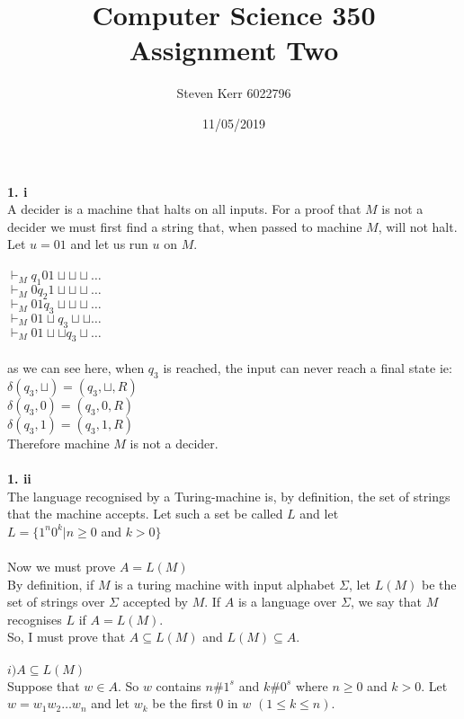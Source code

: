 \documentclass[a4paper,12pt]{article}
\title{Computer Science 350 \\
\large Assignment Two}
\author{Steven Kerr 6022796}
\date{11/05/2019}
\begin{document}
\maketitle

\noindent \textbf{1. i} \\
A decider is a machine that halts on all inputs. For a proof that $M$ is not a decider we must first find a string that, when passed to machine $M$, will not halt. \\
Let $u=01$ and let us run $u$ on $M$. \\
\\
$\vdash_M q_1 0 1 \sqcup \sqcup \sqcup \dots$ \\
$\vdash_M 0 q_2 1 \sqcup \sqcup \sqcup \dots$ \\
$\vdash_M 0 1 q_3 \sqcup \sqcup \sqcup \dots$ \\
$\vdash_M 0 1 \sqcup q_3 \sqcup \sqcup \dots$ \\
$\vdash_M 0 1 \sqcup \sqcup q_3 \sqcup \dots$ \\
\\
as we can see here, when $q_3$ is reached, the input can never reach a final state ie: \\
$\delta ( q_3 , \sqcup ) = ( q_3 , \sqcup , R )$ \\
$\delta ( q_3 , 0 ) = ( q_3 , 0 , R )$ \\
$\delta ( q_3 , 1 ) = ( q_3 , 1 , R )$ \\
Therefore machine $M$ is not a decider. \\
\\
\textbf{1. ii} \\
The language recognised by a Turing-machine is, by definition, the set of strings that the machine accepts. Let such a set be called $L$ and let \\
$L=\{1^n 0^k | n \geq 0$ and $k > 0\}$ \\
\\
Now we must prove $A=L(M)$ \\
By definition, if $M$ is a turing machine with input alphabet $\Sigma$, let $L(M)$ be the set of strings over $\Sigma$ accepted by $M$. If $A$ is a language over $\Sigma$, we say that $M$ recognises $L$ if $A=L(M)$. \\
So, I must prove that $A \subseteq L(M)$ and $L(M) \subseteq A$. \\
\\
$i) A \subseteq L(M)$ \\
Suppose that $w \in A$. So $w$ contains $n\#1^s$ and $k\#0^s$ where $n \geq 0$ and $k > 0$. Let $w = w_1 w_2 \dots w_n$ and let $w_k$ be the first $0$ in $w$ $(1 \leq  k \leq n)$.
\end{document}
